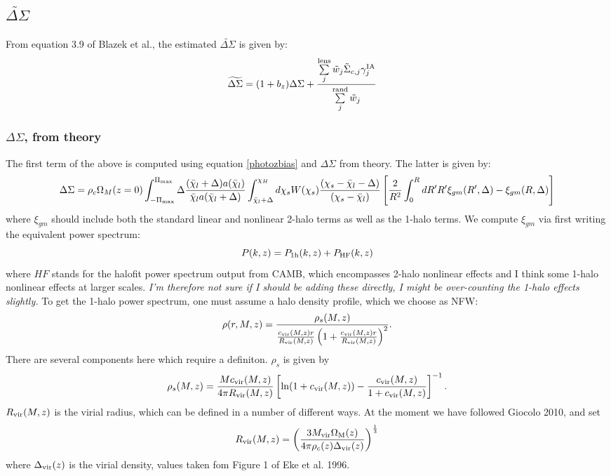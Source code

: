 \documentclass[onecolumn,amsmath,aps,fleqn, superscriptaddress]{revtex4}
\begin{document}
\subsection*{$\widetilde{\Delta \Sigma}$}
From equation 3.9 of Blazek et al., the estimated $\widetilde{\Delta \Sigma}$ is given by:
\begin{align}
\widetilde{\Delta \Sigma}&= (1+b_z) \Delta \Sigma + \frac{\sum\limits_{j}^{\rm lens} \tilde{w}_j \tilde{\Sigma}_{c,j} \gamma^{\rm IA}_j }{\sum\limits_{j}^{\rm rand} \tilde{w}_j} 
\label{deltasigma}
\end{align}

\subsubsection*{$\Delta \Sigma$, from theory}
The first term of the above is computed using equation \ref{photozbias} and $\Delta \Sigma$ from theory. The latter is given by:
\begin{equation}
\Delta \Sigma = \rho_c \Omega_M(z=0) \int_{-\Pi_{\rm max}}^{\Pi_{\rm max}} \Delta \frac{(\bar{\chi}_l+\Delta) a(\bar{\chi}_l)}{\bar{\chi}_l a(\bar{\chi}_l+\Delta)} \int_{\bar{\chi}_l+\Delta}^{\chi_H}d\chi_s W(\chi_s) \frac{(\chi_s - \bar{\chi}_l-\Delta)}{(\chi_s-\bar{\chi}_l)}\left[\frac{2}{R^2}\int_0^{R}dR' R' \xi_{gm}(R', \Delta) - \xi_{gm}(R, \Delta)\right]
\label{DS_the}
\end{equation}
where $\xi_{gm}$ should include both the standard linear and nonlinear 2-halo terms as well as the 1-halo terms. We compute $\xi_{gm}$ via first writing the equivalent power spectrum:
\begin{equation}
P(k,z) = P_{\rm 1h}(k,z) + P_{\rm HF}(k,z)
\label{Pk}
\end{equation}
where $HF$ stands for the halofit power spectrum output from CAMB, which encompasses 2-halo nonlinear effects and I think some 1-halo nonlinear effects at larger scales. {\it I'm therefore not sure if I should be adding these directly, I might be over-counting the 1-halo effects slightly.} To get the 1-halo power spectrum, one must assume a halo density profile, which we choose as NFW:
\begin{equation}
\rho(r, M, z) = \frac{\rho_s(M,z)}{\frac{c_{\rm vir}(M,z)r}{R_{\rm vir}(M,z)}\left(1+\frac{c_{\rm vir}(M,z)r}{R_{\rm vir}(M,z)}\right)^2}.
\label{nfw}
\end{equation}
There are several components here which require a definiton. $\rho_s$ is given by
\begin{equation}
\rho_s(M,z) = \frac{Mc_{\rm vir}(M,z)}{4 \pi R_{\rm vir}(M,z)}\left[{\rm ln} (1+ c_{\rm vir}(M,z)) - \frac{c_{\rm vir}(M,z)}{1+c_{\rm vir}(M,z)}\right]^{-1}.
\label{rhos}
\end{equation}
$R_{\rm vir}(M,z)$ is the virial radius, which can be defined in a number of different ways. At the moment we have followed Giocolo 2010, and set
\begin{equation}
R_{\rm vir}(M,z) = \left(\frac{3 M_{\rm vir}\Omega_{\rm M}(z)}{4 \pi \rho_c(z)\Delta_{\rm vir}(z)}\right)^{\frac{1}{3}}
\label{Rvir}
\end{equation}
where $\Delta_{\rm vir}(z)$ is the virial density, values taken fom Figure 1 of Eke et al. 1996.
\end{document}
